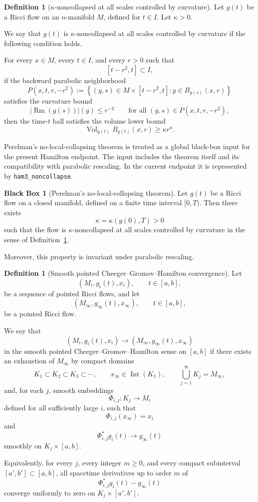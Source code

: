 \documentclass[11pt]{article}
\theoremstyle{plain}
\theoremstyle{definition}
\newtheorem{definition}[theorem]{Definition}
\newtheorem{blackbox}[theorem]{Black Box}
\theoremstyle{remark}
\newcommand{\Rm}{\operatorname{Rm}}
\newcommand{\Vol}{\operatorname{Vol}}
\newcommand{\norm}[1]{\left|#1\right|}
\newcommand{\leanref}[1]{\nolinkurl{#1}}
\begin{document}
\begin{definition}[\texorpdfstring{$\kappa$}{kappa}-noncollapsed at all scales controlled by curvature]
\label{def:kappa-noncollapsed}
Let $g(t)$ be a Ricci flow on an $n$-manifold $M$, defined for
$t\in I$. Let $\kappa>0$.

We say that $g(t)$ is $\kappa$-noncollapsed at all scales controlled by
curvature if the following condition holds.

For every $x\in M$, every $t\in I$, and every $r>0$ such that
\[
[t-r^2,t]\subset I,
\]
if the backward parabolic neighborhood
\[
P(x,t,r,-r^2)
:=
\left\{
(y,s)\in M\times[t-r^2,t]
:
y\in B_{g(s)}(x,r)
\right\}
\]
satisfies the curvature bound
\[
\norm{\Rm(g(s))}(y)\le r^{-2}
\qquad
\text{for all }(y,s)\in P(x,t,r,-r^2),
\]
then the time-$t$ ball satisfies the volume lower bound
\[
\Vol_{g(t)} B_{g(t)}(x,r)\ge \kappa r^n.
\]
\end{definition}

Perelman's no-local-collapsing theorem is treated as a global black-box input
for the present Hamilton endpoint.  The input includes the theorem itself and
its compatibility with parabolic rescaling.  In the current endpoint it is
represented by \leanref{ham3_noncollapse}.

\begin{blackbox}[Perelman's no-local-collapsing theorem]
\label{bb:no-local-collapsing}
Let $g(t)$ be a Ricci flow on a closed manifold, defined on a finite time
interval $[0,T)$. Then there exists
\[
\kappa=\kappa(g(0),T)>0
\]
such that the flow is $\kappa$-noncollapsed at all scales controlled by
curvature in the sense of Definition~\ref{def:kappa-noncollapsed}.

Moreover, this property is invariant under parabolic rescaling.
\end{blackbox}

\begin{definition}[Smooth pointed Cheeger--Gromov--Hamilton convergence]
\label{def:cgh-convergence}
Let
\[
(M_i,g_i(t),x_i),
\qquad
 t\in [a,b],
\]
be a sequence of pointed Ricci flows, and let
\[
(M_\infty,g_\infty(t),x_\infty),
\qquad
 t\in [a,b],
\]
be a pointed Ricci flow.

We say that
\[
(M_i,g_i(t),x_i)
\longrightarrow
(M_\infty,g_\infty(t),x_\infty)
\]
in the smooth pointed Cheeger--Gromov--Hamilton sense on $[a,b]$ if there
exists an exhaustion of $M_\infty$ by compact domains
\[
K_1\subset K_2\subset K_3\subset\cdots,
\qquad
x_\infty\in \operatorname{Int}(K_1),
\qquad
\bigcup_{j=1}^\infty K_j=M_\infty,
\]
and, for each $j$, smooth embeddings
\[
\Phi_{i,j}:K_j\to M_i
\]
defined for all sufficiently large $i$, such that
\[
\Phi_{i,j}(x_\infty)=x_i
\]
and
\[
\Phi_{i,j}^*g_i(t)\longrightarrow g_\infty(t)
\]
smoothly on $K_j\times [a,b]$.

Equivalently, for every $j$, every integer $m\ge 0$, and every compact
subinterval $[a',b']\subset [a,b]$, all spacetime derivatives up to order $m$
of
\[
\Phi_{i,j}^*g_i(t)-g_\infty(t)
\]
converge uniformly to zero on $K_j\times [a',b']$.
\end{definition}
\end{document}
